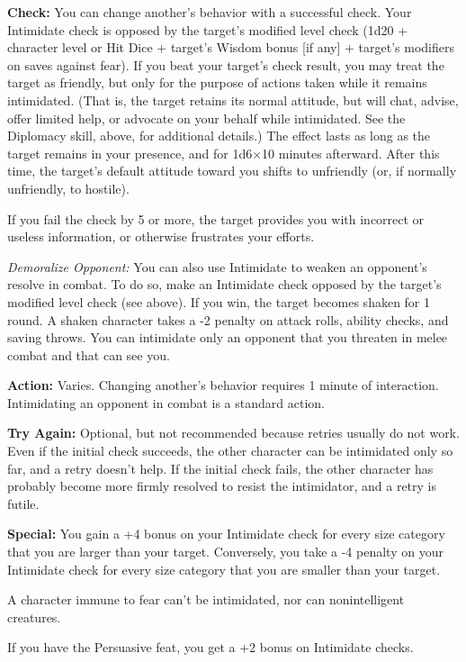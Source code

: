 \documentclass{article}
\begin{document}
\textbf{Check:} You can change another's behavior with a successful check. Your 
Intimidate check is opposed by the target's modified level check (1d20 + character 
level or Hit Dice + target's Wisdom bonus [if any] + target's modifiers on saves 
against fear). If you beat your target's check result, you may treat the target 
as friendly, but only for the purpose of actions taken while it remains intimidated. 
(That is, the target retains its normal attitude, but will chat, advise, offer 
limited help, or advocate on your behalf while intimidated. See the Diplomacy skill, 
above, for additional details.) The effect lasts as long as the target remains 
in your presence, and for 1d6\ensuremath{\times}10 minutes afterward. After this 
time, the target's default attitude toward you shifts to unfriendly (or, if normally 
unfriendly, to hostile).

If you fail the check by 5 or more, the target provides you with incorrect or useless 
information, or otherwise frustrates your efforts.

\textit{Demoralize Opponent: }You can also use Intimidate to weaken an opponent's 
resolve in combat. To do so, make an Intimidate check opposed by the target's modified 
level check (see above). If you win, the target becomes shaken for 1 round. A shaken 
character takes a -2 penalty on attack rolls, ability checks, and saving throws. 
You can intimidate only an opponent that you threaten in melee combat and that 
can see you.

\textbf{Action:} Varies. Changing another's behavior requires 1 minute of interaction. 
Intimidating an opponent in combat is a standard action.

\textbf{Try Again:} Optional, but not recommended because retries usually do not 
work. Even if the initial check succeeds, the other character can be intimidated 
only so far, and a retry doesn't help. If the initial check fails, the other character 
has probably become more firmly resolved to resist the intimidator, and a retry 
is futile.

\textbf{Special:} You gain a +4 bonus on your Intimidate check for every size category 
that you are larger than your target. Conversely, you take a -4 penalty on your 
Intimidate check for every size category that you are smaller than your target.

A character immune to fear can't be intimidated, nor can nonintelligent creatures.

If you have the Persuasive feat, you get a +2 bonus on Intimidate checks.
\end{document}
